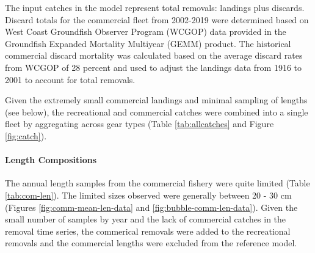 \documentclass[11pt,
  english,
  a4paper,
]{article}
\begin{document}
\leavevmode\tagmcend\tagstructend\par


The input catches in the model represent total removals: landings plus discards. Discard totals for the commercial fleet from 2002-2019 were determined based on West Coast Groundfish Observer Program (WCGOP) data provided in the Groundfish Expanded Mortality Multiyear (GEMM) product. The historical commercial discard mortality was calculated based on the average discard rates from WCGOP of 28 percent and used to adjust the landings data from 1916 to 2001 to account for total removals.

\leavevmode\tagmcend\tagstructend\par


Given the extremely small commercial landings and minimal sampling of lengths (see below), the recreational and commercial catches were combined into a single fleet by aggregating across gear types (Table \ref{tab:allcatches} and Figure \ref{fig:catch}).

\leavevmode\tagmcend\tagstructend\par


\hypertarget{length-compositions-1}{%
\paragraph{Length Compositions}\label{length-compositions-1}}

\leavevmode\tagmcend\tagstructend


The annual length samples from the commercial fishery were quite limited (Table \ref{tab:com-len}). The limited sizes observed were generally between 20 - 30 cm (Figures \ref{fig:comm-mean-len-data} and \ref{fig:bubble-comm-len-data}). Given the small number of samples by year and the lack of commercial catches in the removal time series, the commerical removals were added to the recreational removals and the commercial lengths were excluded from the reference model.

\leavevmode\tagmcend\tagstructend\par

\end{document}
